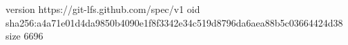 version https://git-lfs.github.com/spec/v1
oid sha256:a4a71e01d4da9850b4090e1f8f3342e34c519d8796da6aea88b5c03664424d38
size 6696
